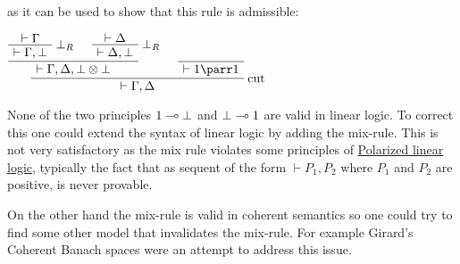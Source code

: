as it can be used to show that this rule is admissible:

\(\AxRule{\vdash\Gamma}
\LabelRule{\bot_R}
\UnaRule{\vdash\Gamma, \bot}
\AxRule{\vdash\Delta}
\LabelRule{\bot_R}
\UnaRule{\vdash\Delta, \bot}
\BinRule{\vdash \Gamma, \Delta, \bot\tens\bot}
\NulRule{\vdash \one\parr\one}
\LabelRule{\rulename{cut}}
\BinRule{\vdash\Gamma,\Delta}
\DisplayProof\)

None of the two principles \(1\multimap\bot\) and \(\bot\multimap1\) are
valid in linear logic. To correct this one could extend the syntax of
linear logic by adding the mix-rule. This is not very satisfactory as
the mix rule violates some principles of
\href{Polarized_linear_logic}{Polarized linear logic}, typically the
fact that as sequent of the form \(\vdash P_1, P_2\) where \(P_1\) and
\(P_2\) are positive, is never provable.

On the other hand the mix-rule is valid in coherent semantics so one
could try to find some other model that invalidates the mix-rule. For
example Girard's Coherent Banach spaces were an attempt to address this
issue.


